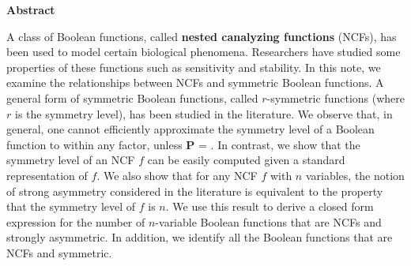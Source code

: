 \vspace*{-0.05in}
\begin{center}
\textbf{Abstract}  %
\end{center}

\smallskip

A class of Boolean functions, 
called \textbf{nested canalyzing functions} (NCFs),
has been used to model certain biological phenomena.
Researchers have studied some properties of these functions
such as sensitivity and stability.
In this note, we examine the relationships between NCFs and symmetric 
Boolean functions. 
A general form of symmetric Boolean functions,
called $r$-symmetric functions (where $r$ is the symmetry level),
has been studied in the literature.
We observe that, in general,
one cannot efficiently approximate the symmetry level of
a Boolean function to within any factor, unless \textbf{P} = \cnp. 
In contrast, we show that the symmetry level of an NCF $f$
can be easily computed given a standard representation of $f$.
We also show that for any NCF $f$ with $n$ variables, the notion of
strong asymmetry considered in the literature is equivalent to
the property that the symmetry level of $f$ is $n$.
We use this result to derive a closed form expression for the
number of $n$-variable Boolean functions that are NCFs and strongly
asymmetric.
In addition, we identify all the Boolean functions that are NCFs 
and symmetric. 

